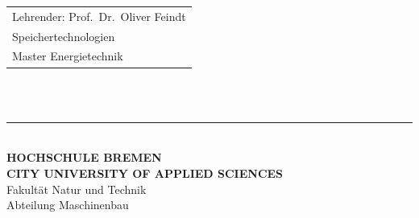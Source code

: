 \begin{titlepage}
    \vspace{5cm}
  
    \hspace*{37mm}
    \begin{minipage}{0.5\linewidth}
      \begin{tabular}{@{}l}
        Lehrender: Prof.\ Dr.\ Oliver Feindt \\
        Speichertechnologien  \\
        Master Energietechnik \\
      \end{tabular}\\
  
      \,\rule{9mm}{1mm}\\[1.5mm]
  
      \textbf{HOCHSCHULE BREMEN}\\
      \textbf{CITY UNIVERSITY OF APPLIED SCIENCES}\\
      Fakultät Natur und Technik\\
      Abteilung Maschinenbau\\
    \end{minipage}
  \end{titlepage}
  \restoregeometry
  \thispagestyle{empty}
  